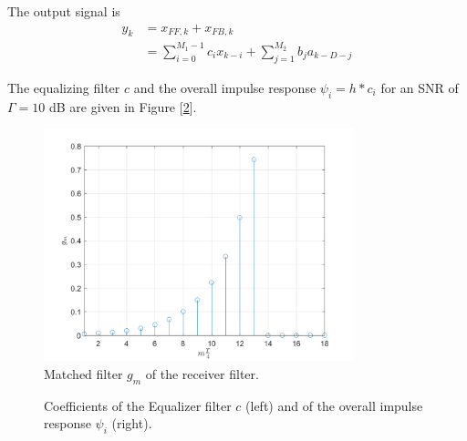 \documentclass[a4paper, 12pt]{report}
\begin{document}
The output signal is 
\begin{equation}
\begin{split}
y_k &= x_{FF,k} + x_{FB,k} \\
	&= \sum_{i=0}^{M_1-1}c_ix_{k-i} + \sum_{j=1}^{M_2}b_ja_{k-D-j}
\end{split}
\end{equation}

\clearpage
The equalizing filter $c$ and the overall impulse response $\psi_i=h*c_i$ for an SNR of $\Gamma = 10$ dB are given in Figure [\ref{filters_a}]. 

\begin{figure}[H]
	\centering
	\includegraphics[width=9cm]{images/RecA_gm}
	\caption{Matched filter $g_m$ of the receiver filter.}\label{gm_a}
\end{figure}

\begin{figure}[H]
	\centering
	\caption{Coefficients of the Equalizer filter $c$ (left) and of the overall impulse response $\psi_i$ (right).}\label{filters_a}
\end{figure}
\end{document}
